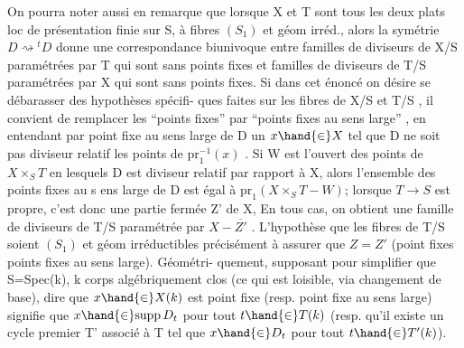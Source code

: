 
On pourra noter aussi en remarque que lorsque X et T sont tous les
deux plats loc de présentation finie sur S, à fibres $(S_1)$ et géom irréd.,
alors la symétrie $D \rightsquigarrow {}^{t}D$ donne une correspondance biunivoque entre
familles de diviseurs de X/S paramétrées par T qui sont sans points fixes
et familles de diviseurs de T/S paramétrées par X qui sont sans points
fixes. Si dans cet énoncé on désire se débarasser des hypothèses spécifi-%
ques faites sur les fibres de X/S et T/S , il convient de remplacer
les ``points fixes'' par ``points fixes au sens large'' , en entendant par
point fixe au sens large de D un $x \hand{\in} X$ tel que D ne soit pas diviseur
 relatif   les points de $\mathrm{pr}_1^{-1}(x)$ . Si W est l'ouvert des
points de $X\times_S T$ en lesquels D est  diviseur  relatif par
rapport à X, alors l'ensemble des points fixes au s ens large de D est
 égal à $\mathrm{pr}_1(X\times_S T - W)$; lorsque $T \to S$ est propre, c'est donc
une partie fermée Z' de X,  En tous cas, on obtient une
famille de diviseurs de T/S paramétrée par $X-\overline{Z'}$ . L'hypothèse que les
fibres de T/S soient $(S_1)$ et géom irréductibles   précisément à
assurer que $Z=Z'$ (point fixes \unsure{$=$} points fixes au sens large). Géométri-%
quement, supposant pour simplifier que S=Spec(k), k corps algébriquement
clos (ce qui est loisible,  via changement de base), dire que $x \hand{\in} X(k)$
est point fixe (resp. point fixe au sens large) signifie que $x \hand{\in} \mathrm{supp}\, D_t$
pour tout $t \hand{\in} T(k)$ (resp. qu'il existe un cycle premier T' associé à T
tel que $x \hand{\in} D_t$ pour tout $t \hand{\in} T'(k)$).

